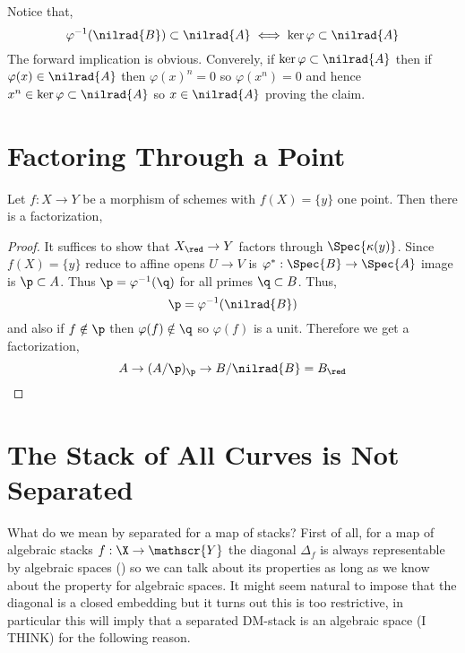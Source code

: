 \documentclass[12pt]{article}
\begin{document}
\begin{rmk}
Notice that,
\[ \varphi^{-1}(\nilrad{B}) \subset \nilrad{A} \iff \ker{\varphi} \subset \nilrad{A} \] 
The forward implication is obvious. Converely, if $\ker{\varphi} \subset \nilrad{A}$ then if $\varphi(x) \in \nilrad{A}$ then $\varphi(x)^n = 0$ so $\varphi(x^n) = 0$ and hence $x^n \in \ker{\varphi} \subset \nilrad{A}$ so $x \in \nilrad{A}$ proving the claim. 
\end{rmk}

\section{Factoring Through a Point}

\begin{prop}
Let $f : X \to Y$ be a morphism of schemes with $f(X) = \{ y \}$ one point. Then there is a factorization,
\begin{center}
\end{center}
\end{prop}

\begin{proof}
It suffices to show that $X_{\red} \to Y$ factors through $\Spec{\kappa(y)}$. Since $f(X) = \{ y \}$ reduce to affine opens $U \to V$ is $\varphi^* : \Spec{B} \to \Spec{A}$ image is $\p \subset A$. Thus $\p = \varphi^{-1}(\q)$ for all primes $\q \subset B$. Thus,
\[ \p = \varphi^{-1}(\nilrad{B}) \]
and also if $f \notin \p$ then $\varphi(f) \notin \q$ so $\varphi(f)$ is a unit. Therefore we get a factorization,
\[ A \to (A / \p)_{\p} \to B/\nilrad{B} = B_{\red} \]
\end{proof}

\section{The Stack of All Curves is Not Separated}

\newcommand{\Y}{\mathscr{Y}}
\newcommand{\Isom}[3][]{\mathrm{Isom}_{#1} \left( #2, #3 \right)}

\begin{rmk}
What do we mean by separated for a map of stacks? First of all, for a map of algebraic stacks $f : \X \to \Y$ the diagonal $\Delta_f$ is always representable by algebraic spaces () so we can talk about its properties as long as we know about the property for algebraic spaces. It might seem natural to impose that the diagonal is a closed embedding but it turns out this is too restrictive, in particular this will imply that a separated DM-stack is an algebraic space (I THINK) for the following reason.
\end{rmk}
\end{document}
